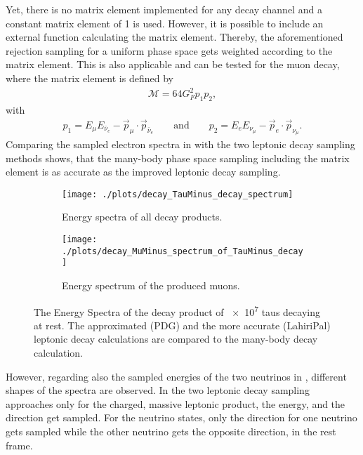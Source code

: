 Yet, there is no matrix element implemented for any decay channel and a constant matrix element of 1 is used.
However, it is possible to include an external function calculating the matrix element.
Thereby, the aforementioned rejection sampling for a uniform phase space gets weighted according to the matrix element.
This is also applicable and can be tested for the muon decay, where the matrix element is defined by
\begin{align}
    \mathcal{M} = 64 G_F^2 p_1 p_2 ,
\end{align}
with
\begin{align}
    p_1 = E_\mu E_{\bar{\nu}_e} - \vec{p}_\mu \cdot \vec{p}_{\bar{\nu}_e}
    \qquad \text{and} \qquad
    p_2 = E_e E_{\nu_\mu} - \vec{p}_e \cdot \vec{p}_{\nu_\mu} .
\end{align}
Comparing the sampled electron spectra in  with the two leptonic decay sampling methods shows, that the many-body phase space sampling including the matrix element is as accurate as the improved leptonic decay sampling.
\begin{figure}
    \centering
    \begin{subfigure}{0.8\textwidth}
        \centering
        \texttt{[image: ./plots/decay\_TauMinus\_decay\_spectrum]}
        \caption{Energy spectra of all decay products.}
        \label{fig:decay_sampling_all_products}
        \vspace{0.5cm}
    \end{subfigure}
    \begin{subfigure}{0.8\textwidth}
        \centering
        \texttt{[image: ./plots/decay\_MuMinus\_spectrum\_of\_TauMinus\_decay]}
        \caption{Energy spectrum of the produced muons.}
        \label{fig:decay_sampling_mu_products}
    \end{subfigure}
    \caption{The Energy Spectra of the decay product of \num{e7} taus decaying at rest. The approximated (PDG) and the more accurate (LahiriPal) leptonic decay calculations are compared to the many-body decay calculation.}
    \label{fig:decay_sampling}
\end{figure}
However, regarding also the sampled energies of the two neutrinos in , different shapes of the spectra are observed.
In the two leptonic decay sampling approaches only for the charged, massive leptonic product, the energy, and the direction get sampled.
For the neutrino states, only the direction for one neutrino gets sampled while the other neutrino gets the opposite direction, in the rest frame.
